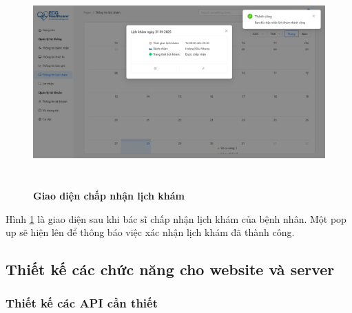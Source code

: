 \begin{figure}[H]
	\centering
	\includegraphics[width=15cm,height=8cm]{Images/doctor_ui/accepted.png}
	\caption[Giao diện chấp nhận lịch khám]{\bfseries \fontsize{12pt}{0pt}\selectfont Giao diện chấp nhận lịch khám}
	\label{accepted}
\end{figure}

Hình \ref{accepted} là giao diện sau khi bác sĩ chấp nhận lịch khám của bệnh nhân. Một pop up sẽ hiện lên để thông báo việc xác nhận lịch khám đã thành công.


\subsection{Thiết kế các chức năng cho website và server}

\subsubsection{Thiết kế các API cần thiết}



